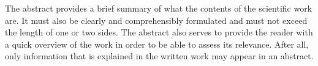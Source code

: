 The abstract provides a brief summary of what the contents of the scientific work are. It must also be clearly and comprehensibly formulated and must not exceed the length of one or two sides. The abstract also serves to provide the reader with a quick overview of the work in order to be able to assess its relevance. After all, only information that is explained in the written work may appear in an abstract.
